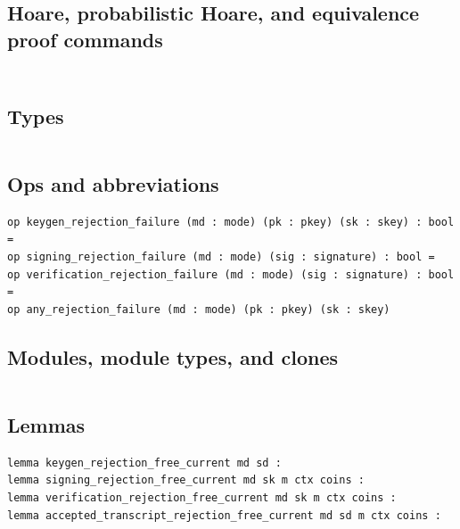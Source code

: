 \subsection*{Hoare, probabilistic Hoare, and equivalence proof commands}
\begin{lstlisting}[language=EasyCrypt,basicstyle=\ttfamily\tiny]
\end{lstlisting}

\section*{}

\subsection*{Types}
\begin{lstlisting}[language=EasyCrypt,basicstyle=\ttfamily\tiny]
\end{lstlisting}

\subsection*{Ops and abbreviations}
\begin{lstlisting}[language=EasyCrypt,basicstyle=\ttfamily\tiny]
op keygen_rejection_failure (md : mode) (pk : pkey) (sk : skey) : bool =
op signing_rejection_failure (md : mode) (sig : signature) : bool =
op verification_rejection_failure (md : mode) (sig : signature) : bool =
op any_rejection_failure (md : mode) (pk : pkey) (sk : skey)
\end{lstlisting}

\subsection*{Modules, module types, and clones}
\begin{lstlisting}[language=EasyCrypt,basicstyle=\ttfamily\tiny]
\end{lstlisting}

\subsection*{Lemmas}
\begin{lstlisting}[language=EasyCrypt,basicstyle=\ttfamily\tiny]
lemma keygen_rejection_free_current md sd :
lemma signing_rejection_free_current md sk m ctx coins :
lemma verification_rejection_free_current md sk m ctx coins :
lemma accepted_transcript_rejection_free_current md sd m ctx coins :
\end{lstlisting}


